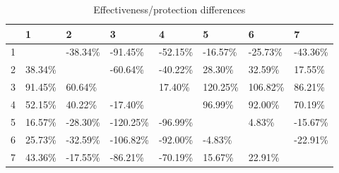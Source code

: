 \begin{table}[ht]
\centering
\begin{tabular}{rlllllll}
  \hline
 & 1 & 2 & 3 & 4 & 5 & 6 & 7 \\ 
  \hline
1 &  & -38.34\% & -91.45\% & -52.15\% & -16.57\% & -25.73\% & -43.36\% \\ 
  2 & 38.34\% &  & -60.64\% & -40.22\% & 28.30\% & 32.59\% & 17.55\% \\ 
  3 & 91.45\% & 60.64\% &  & 17.40\% & 120.25\% & 106.82\% & 86.21\% \\ 
  4 & 52.15\% & 40.22\% & -17.40\% &  & 96.99\% & 92.00\% & 70.19\% \\ 
  5 & 16.57\% & -28.30\% & -120.25\% & -96.99\% &  & 4.83\% & -15.67\% \\ 
  6 & 25.73\% & -32.59\% & -106.82\% & -92.00\% & -4.83\% &  & -22.91\% \\ 
  7 & 43.36\% & -17.55\% & -86.21\% & -70.19\% & 15.67\% & 22.91\% &  \\ 
   \hline
\end{tabular}
\caption{Effectiveness/protection differences} 
\end{table}
